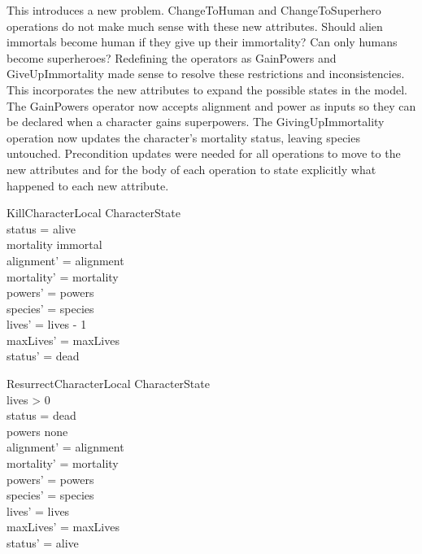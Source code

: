 \documentclass{article}
\begin{document}
\hspace{-0.68cm} This introduces a new problem. ChangeToHuman and ChangeToSuperhero operations do not make much sense with these new attributes. Should alien immortals become human if they give up their immortality? Can only humans become superheroes? Redefining the operators as GainPowers and GiveUpImmortality made sense to resolve these restrictions and inconsistencies. This incorporates the new attributes to expand the possible states in the model. \\
\newline
The GainPowers operator now accepts alignment and power as inputs so they can be declared when a character gains superpowers. The GivingUpImmortality operation now updates the character's mortality status, leaving species untouched. Precondition updates were needed for all operations to move to the new attributes and for the body of each operation to state explicitly what happened to each new attribute.
\begin{schema}{KillCharacterLocal} 
\Delta CharacterState \\
\where
status = alive \\
mortality \neq immortal \\
alignment' = alignment \\
mortality' = mortality \\
powers' = powers \\ 
species' = species \\
lives' = lives - 1 \\
maxLives' = maxLives \\
status' = dead \\
\end{schema}

\begin{schema}{ResurrectCharacterLocal}
\Delta CharacterState \\
\where
lives > 0 \\
status = dead \\
powers \neq none \\ 
alignment' = alignment \\
mortality' = mortality \\
powers' = powers \\ 
species' = species \\
lives' = lives \\
maxLives' = maxLives \\
status' = alive \\
\end{schema}
\end{document}
